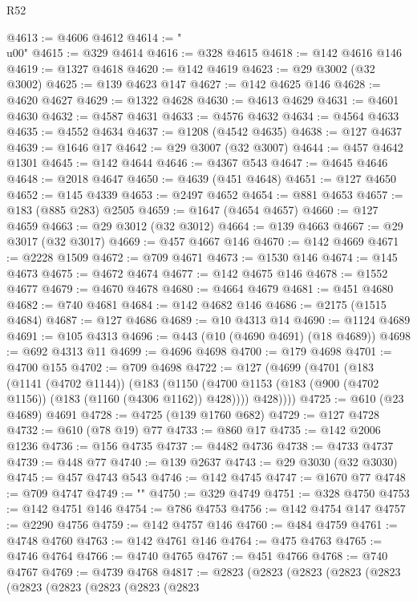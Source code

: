 \begin{lexlean}{R52}
\begin{coremodule}
@4613 := @4606 @4612
@4614 := "\\u00"
@4615 := @329 @4614
@4616 := @328 @4615
@4618 := @142 @4616 @146
@4619 := @1327 @4618
@4620 := @142 @4619
@4623 := @29 @3002 (@32 @3002)
@4625 := @139 @4623 @147
@4627 := @142 @4625 @146
@4628 := @4620 @4627
@4629 := @1322 @4628
@4630 := @4613 @4629
@4631 := @4601 @4630
@4632 := @4587 @4631
@4633 := @4576 @4632
@4634 := @4564 @4633
@4635 := @4552 @4634
@4637 := @1208 (@4542 @4635)
@4638 := @127 @4637
@4639 := @1646 @17
@4642 := @29 @3007 (@32 @3007)
@4644 := @457 @4642 @1301
@4645 := @142 @4644
@4646 := @4367 @543
@4647 := @4645 @4646
@4648 := @2018 @4647
@4650 := @4639 (@451 @4648)
@4651 := @127 @4650
@4652 := @145 @4339
@4653 := @2497 @4652
@4654 := @881 @4653
@4657 := @183 (@885 @283) @2505
@4659 := @1647 (@4654 @4657)
@4660 := @127 @4659
@4663 := @29 @3012 (@32 @3012)
@4664 := @139 @4663
@4667 := @29 @3017 (@32 @3017)
@4669 := @457 @4667 @146
@4670 := @142 @4669
@4671 := @2228 @1509
@4672 := @709 @4671
@4673 := @1530 @146
@4674 := @145 @4673
@4675 := @4672 @4674
@4677 := @142 @4675 @146
@4678 := @1552 @4677
@4679 := @4670 @4678
@4680 := @4664 @4679
@4681 := @451 @4680
@4682 := @740 @4681
@4684 := @142 @4682 @146
@4686 := @2175 (@1515 @4684)
@4687 := @127 @4686
@4689 := @10 @4313 @14
@4690 := @1124 @4689
@4691 := @105 @4313
@4696 := @443 (@10 (@4690 @4691) (@18 @4689))
@4698 := @692 @4313 @11
@4699 := @4696 @4698
@4700 := @179 @4698
@4701 := @4700 @155
@4702 := @709 @4698
@4722 := @127
    (@4699
      (@4701
        (@183
          (@1141 (@4702 @1144))
          (@183
            (@1150 (@4700 @1153 (@183 (@900 (@4702 @1156)) (@183 (@1160 (@4306 @1162)) @428))))
            @428))))
@4725 := @610 (@23 @4689) @4691
@4728 := @4725 (@139 @1760 @682)
@4729 := @127 @4728
@4732 := @610 (@78 @19) @77
@4733 := @860 @17
@4735 := @142 @2006 @1236
@4736 := @156 @4735
@4737 := @4482 @4736
@4738 := @4733 @4737
@4739 := @448 @77
@4740 := @139 @2637
@4743 := @29 @3030 (@32 @3030)
@4745 := @457 @4743 @543
@4746 := @142 @4745
@4747 := @1670 @77
@4748 := @709 @4747
@4749 := "\n"
@4750 := @329 @4749
@4751 := @328 @4750
@4753 := @142 @4751 @146
@4754 := @786 @4753
@4756 := @142 @4754 @147
@4757 := @2290 @4756
@4759 := @142 @4757 @146
@4760 := @484 @4759
@4761 := @4748 @4760
@4763 := @142 @4761 @146
@4764 := @475 @4763
@4765 := @4746 @4764
@4766 := @4740 @4765
@4767 := @451 @4766
@4768 := @740 @4767
@4769 := @4739 @4768
@4817 := @2823
    (@2823
      (@2823
        (@2823
          (@2823
            (@2823
              (@2823
                (@2823
                  (@2823
                    (@2823

\end{coremodule}
\end{lexlean}
